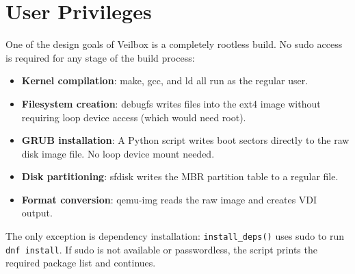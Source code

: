 \section{User Privileges}

One of the design goals of Veilbox is a completely rootless build. No
sudo access is required for any stage of the build process:

\begin{itemize}[nosep]
  \item \textbf{Kernel compilation}: make, gcc, and ld all run as the
        regular user.
  \item \textbf{Filesystem creation}: debugfs writes files into the ext4
        image without requiring loop device access (which would need root).
  \item \textbf{GRUB installation}: A Python script writes boot sectors
        directly to the raw disk image file. No loop device mount needed.
  \item \textbf{Disk partitioning}: sfdisk writes the MBR partition table
        to a regular file.
  \item \textbf{Format conversion}: qemu-img reads the raw image and
        creates VDI output.
\end{itemize}

The only exception is dependency installation: \texttt{install\_deps()}
uses sudo to run \texttt{dnf install}. If sudo is not available or
passwordless, the script prints the required package list and continues.
